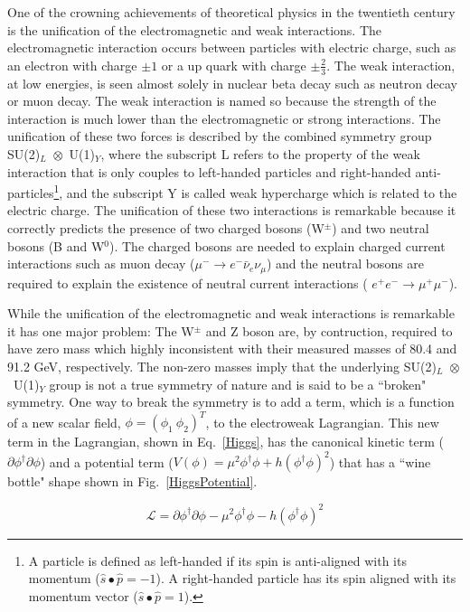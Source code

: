 One of the crowning achievements of theoretical physics in the twentieth century is the unification of the electromagnetic and weak interactions. The electromagnetic interaction occurs between particles with electric charge, such as an electron with charge $\pm1$ or a up quark with charge $\pm\frac{2}{3}$. The weak interaction, at low energies, is seen almost solely in nuclear beta decay such as neutron decay or muon decay. The weak interaction is named so because the strength of the interaction is much lower than the electromagnetic or strong interactions. The unification of these two forces is described by the combined symmetry group \mbox{SU(2)$_{L}$ $\otimes$ U(1)$_{Y}$}, where the subscript L refers to the property of the weak interaction that is only couples to left-handed particles and right-handed anti-particles\footnote{A particle is defined as left-handed if its spin is anti-aligned with its momentum ($\hat{s}\bullet\hat{p}=-1$). A right-handed particle has its spin aligned with its momentum vector ($\hat{s}\bullet\hat{p}=1$).}, and the subscript Y is called weak hypercharge which is related to the electric charge. The unification of these two interactions is remarkable because it correctly predicts the presence of two charged bosons (W$^{\pm}$) and two neutral bosons (B and W$^{0}$). The charged bosons are needed to explain charged current interactions such as muon decay ($\mu^{-}\rightarrow e^{-} \bar{\nu}_{e} \nu_{\mu}$) and the neutral bosons are required to explain the existence of neutral current interactions ( $e^{+}e^{-} \rightarrow \mu^{+}\mu^{-}$).

While the unification of the electromagnetic and weak interactions is remarkable it has one major problem: The W$^{\pm}$ and Z boson are, by contruction, required to have zero mass which highly inconsistent with their measured masses of 80.4 and 91.2 GeV, respectively. The non-zero masses imply that the underlying \mbox{SU(2)$_{L}$ $\otimes$ U(1)$_{Y}$} group is not a true symmetry of nature and is said to be a ``broken" symmetry. One way to break the symmetry is to add a term, which is a function of a new scalar field, $\phi=\left( \phi_{1}~\phi_{2} \right)^{T}$, to the electroweak Lagrangian. This new term in the Lagrangian, shown in Eq.~\ref{Higgs}, has the canonical kinetic term ($\partial\phi^{\dagger}\partial\phi$) and a potential term ($V(\phi)=\mu^{2}\phi^{\dagger}\phi + h(\phi^{\dagger}\phi)^{2}$) that has a ``wine bottle" shape shown in Fig.~\ref{HiggsPotential}.

\begin{equation}
\label{Higgs}
\mathcal{L} = \partial\phi^{\dagger}\partial\phi - \mu^{2}\phi^{\dagger}\phi - h(\phi^{\dagger}\phi)^{2}
\end{equation}

